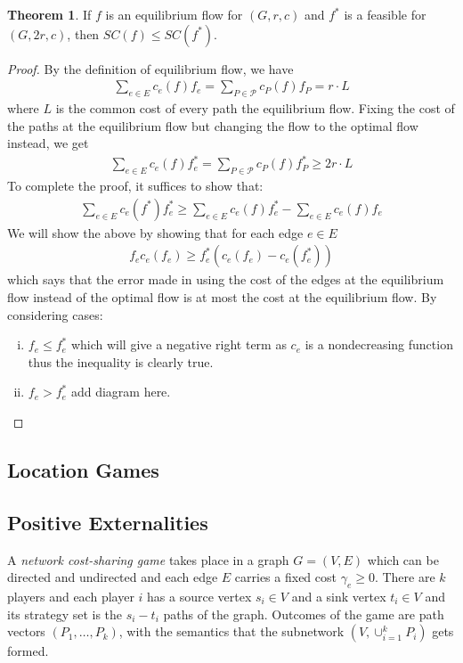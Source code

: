 \documentclass[a4paper,10pt]{article}
\theoremstyle{definition}
\newtheorem{thm}{Theorem}[section]
\begin{document}
\begin{thm}
If $f$ is an equilibrium flow for $(G,r,c)$ and $f^\ast$ is a feasible for $(G,2r,c)$, then $SC(f)\leq SC(f^\ast)$.
\begin{proof}
By the definition of equilibrium flow, we have
\begin{align*}
\sum_{e\in E}c_e(f)f_e=\sum_{P\in\mathcal{P}}c_P(f)f_P = r\cdot L
\end{align*}
where $L$ is the common cost of every path the equilibrium flow. Fixing the cost of the paths at the equilibrium flow but changing the flow to the optimal flow instead, we get
\begin{align*}
\sum_{e\in E}c_e(f)f^\ast_e=\sum_{P\in\mathcal{P}}c_P(f)f_P^\ast \geq 2r\cdot L
\end{align*}
To complete the proof, it suffices to show that: 
\begin{align*}
\sum_{e\in E}c_e(f^\ast)f^\ast_e \geq \sum_{e\in E}c_e(f)f^\ast_e-\sum_{e\in E}c_e(f)f_e
\end{align*}
We will show the above by showing that for each edge $e\in E$
\begin{align*}
f_ec_e(f_e) \geq f_e^\ast(c_e(f_e)-c_e(f_e^\ast))
\end{align*}
which says that the error made in using the cost of the edges at the equilibrium flow instead of the optimal flow is at most the cost at the equilibrium flow. By considering cases:
\begin{enumerate}[(i)]
\item $f_e\leq f_e^\ast$ which will give a negative right term as $c_e$ is a nondecreasing function thus the inequality is clearly true.
\item $f_e > f_e^\ast$
add diagram here.
\end{enumerate}
\end{proof}
\end{thm}


\subsection{Location Games}


\subsection{Positive Externalities}
A \emph{network cost-sharing game} takes place in a graph $G=(V,E)$ which can be directed and undirected and each edge $E$ carries a fixed cost $\gamma_e\geq 0$. There are $k$ players and each player $i$ has a source vertex $s_i \in V$ and a sink vertex $t_i\in V$ and its strategy set is the $s_i-t_i$ paths of the graph. Outcomes of the game are path vectors $(P_1,\ldots,P_k)$, with the semantics that the subnetwork $(V,\cup_{i=1}^{k}P_i)$ gets formed. 
\end{document}
